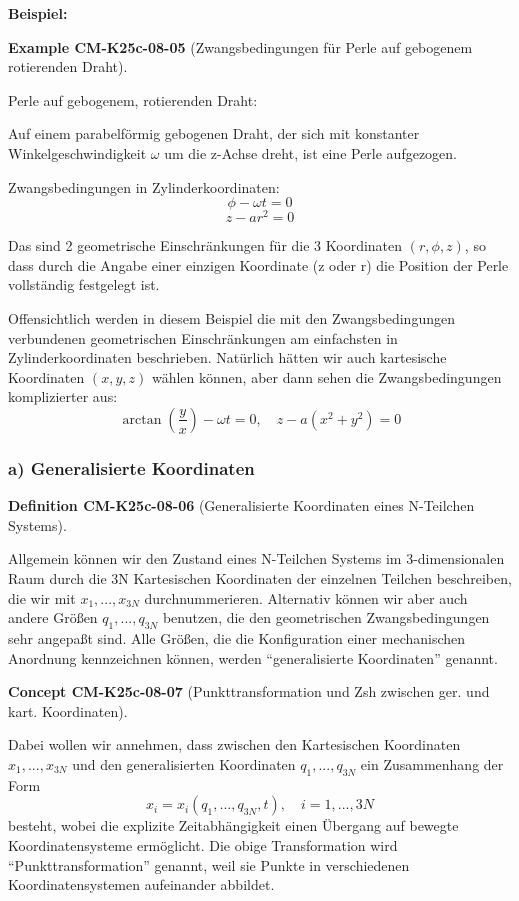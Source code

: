 \documentclass[10pt, letterpaper]{article}
\newcommand{\CustomHeading}[3]{%
  \par\medskip\noindent%
  \textbf{#1 #2} \textnormal{(#3)}.\enskip%
}
\newenvironment{DEF}[2]{\begin{unitbox}\CustomHeading{Definition}{#1}{#2}}{\end{unitbox}}
\newenvironment{EXA}[2]{\begin{unitbox}\CustomHeading{Example}{#1}{#2}}{\end{unitbox}}
\newenvironment{CONC}[2]{\begin{unitbox}\CustomHeading{Concept}{#1}{#2}}{\end{unitbox}}
\begin{document}
\textbf{Beispiel:} 

\begin{EXA}{CM-K25c-08-05}{Zwangsbedingungen für Perle auf gebogenem rotierenden Draht}
Perle auf gebogenem, rotierenden Draht:

Auf einem parabelförmig gebogenen Draht, der sich mit konstanter Winkelgeschwindigkeit $\omega$ um die z-Achse dreht, ist eine Perle aufgezogen.

Zwangsbedingungen in Zylinderkoordinaten:
\[\phi - \omega t = 0\]
\[z - ar^2 = 0\]

Das sind 2 geometrische Einschränkungen für die 3 Koordinaten $(r,\phi,z)$, so dass durch die Angabe einer einzigen Koordinate (z oder r) die Position der Perle vollständig festgelegt ist.

Offensichtlich werden in diesem Beispiel die mit den Zwangsbedingungen verbundenen geometrischen Einschränkungen am einfachsten in Zylinderkoordinaten beschrieben. Natürlich hätten wir auch kartesische Koordinaten $(x,y,z)$ wählen können, aber dann sehen die Zwangsbedingungen komplizierter aus:
\[\arctan(\frac{y}{x})-\omega t = 0, \quad z-a(x^2+y^2) = 0\]
\end{EXA}



\subsubsection{a) Generalisierte Koordinaten}


\begin{DEF}{CM-K25c-08-06}{Generalisierte Koordinaten eines N-Teilchen Systems}
Allgemein können wir den Zustand eines N-Teilchen Systems im 3-dimensionalen Raum durch die 3N Kartesischen Koordinaten der einzelnen Teilchen beschreiben, die wir mit $x_1,...,x_{3N}$ durchnummerieren. Alternativ können wir aber auch andere Größen $q_1,...,q_{3N}$ benutzen, die den geometrischen Zwangsbedingungen sehr angepaßt sind. Alle Größen, die die Konfiguration einer mechanischen Anordnung kennzeichnen können, werden ``generalisierte Koordinaten'' genannt.
\end{DEF}

\begin{CONC}{CM-K25c-08-07}{Punkttransformation und Zsh zwischen ger. und kart. Koordinaten}
Dabei wollen wir annehmen, dass zwischen den Kartesischen Koordinaten $x_1,...,x_{3N}$ und den generalisierten Koordinaten $q_1,...,q_{3N}$ ein Zusammenhang der Form
\[x_i = x_i(q_1,...,q_{3N},t), \quad i=1,...,3N\]
besteht, wobei die explizite Zeitabhängigkeit einen Übergang auf bewegte Koordinatensysteme ermöglicht. Die obige Transformation wird ``Punkttransformation'' genannt, weil sie Punkte in verschiedenen Koordinatensystemen aufeinander abbildet.
\end{CONC}
\end{document}
